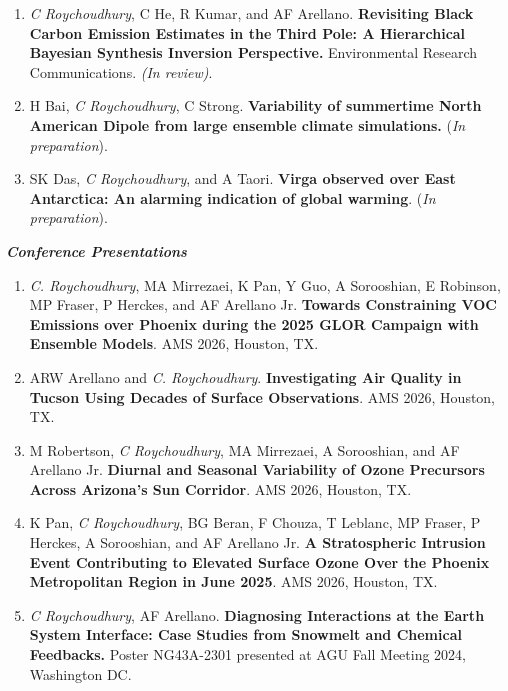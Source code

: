 \documentclass[margin,line]{resume}
\begin{document}
\begin{resume}
\begin{enumerate}[topsep=1pt, partopsep=1pt, itemsep=0.5pt, parsep=0.1pt, leftmargin=15pt,label=\arabic*.]
			\item \textit{C Roychoudhury}, C He, R Kumar, and AF Arellano. \textbf{Revisiting Black Carbon Emission Estimates in the Third Pole: A Hierarchical Bayesian Synthesis Inversion Perspective.} Environmental Research Communications. \textit{(In review)}. 
			
			\item H Bai, \textit{C Roychoudhury}, C Strong. \textbf{Variability of summertime North American Dipole from large ensemble climate simulations.} (\emph{In preparation}).
			
			\item SK Das, \textit{C Roychoudhury}, and A Taori.
			\textbf{Virga observed over East Antarctica: An alarming indication of global warming}. (\emph{In preparation}).
			
			
		\end{enumerate}
		
		
		\textbf{\emph{\textcolor{sep}{Conference Presentations}}}
		\begin{enumerate}[topsep=1pt, partopsep=1pt, itemsep=0.5pt, parsep=0.1pt, leftmargin=15pt,label=\arabic*.]
			
			\item \textit{C. Roychoudhury}, MA Mirrezaei, K Pan, Y Guo, A Sorooshian, E Robinson, MP Fraser, P Herckes, and AF Arellano Jr. \textbf{Towards Constraining VOC Emissions over Phoenix during the 2025 GLOR Campaign with Ensemble Models}. AMS 2026, Houston, TX.
			
			\item ARW Arellano and \textit{C. Roychoudhury}. \textbf{Investigating Air Quality in Tucson Using Decades of Surface Observations}. AMS 2026, Houston, TX.
			
			\item M Robertson, \textit{C Roychoudhury}, MA Mirrezaei, A Sorooshian, and AF Arellano Jr. \textbf{Diurnal and Seasonal Variability of Ozone Precursors Across Arizona's Sun Corridor}. AMS 2026, Houston, TX.
			
			\item K Pan,\textit{ C Roychoudhury}, BG Beran, F Chouza, T Leblanc, MP Fraser, P Herckes, A Sorooshian, and AF Arellano Jr. \textbf{A Stratospheric Intrusion Event Contributing to Elevated Surface Ozone Over the Phoenix Metropolitan Region in June 2025}. AMS 2026, Houston, TX.
			
			\item \textit{C Roychoudhury}, AF Arellano. \textbf{Diagnosing Interactions at the Earth System Interface: Case Studies from Snowmelt and Chemical Feedbacks.} Poster NG43A-2301 presented at AGU Fall Meeting 2024, Washington DC. 
			

\end{enumerate}
\end{resume}
\end{document}
